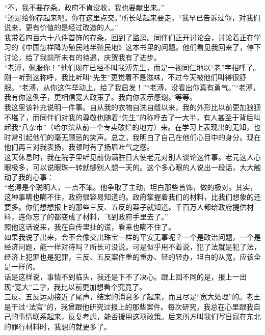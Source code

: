 “不，我不要存条。政府不肯没收，我也要献出来。”\\

“还是给你存起来吧。你在这里点交。”所长站起来要走，“我早已告诉过你，对我们说来，更有价值的是经过改造的人。”\\

我带着四百六十八件首饰的存条，回到了监房。同伴们正开讨论会，讨论着正在学习的《中国怎样降为殖民地半殖民地》这本书里的问题。他们看见我回来了，停下讨论，给了我前所未有的待遇，庆贺我有了进步。\\

“老溥，佩服你！”他们现在已经不叫我溥先生，而是一视同仁地以“老”字相呼了。刚一听到这称呼，我比听叫“先生”更觉着不是滋味，不过今天被他们叫得很舒服。“老溥，从你这件举动上，给了我启发！”“老溥，没看出你真有勇气。”“老溥，我有你这例子，更相信宽大政策了。我向你表示感谢。”等等。\\

我这里该补充说明一件事。自从我的衣物自洗自缝以来，我的外形比以前更加狼狈不堪了，而同伴们对我的尊敬也随着“先生”的称呼去了一大半，有人甚至于背后叫起我“八杂市”（哈尔滨从前一个专卖破烂的地方）来。在学习上表现出的无知，也时常引起他们的毫无顾忌的笑声。总之，我明白了自己在他们心目中的身分。现在他们再三对我表扬，我顿时有了扬眉吐气之感。\\

这天休息时，我在院子里听见前伪满驻日大使老元对别人谈论这件事。老元这人心眼极多，可以说眼珠一转就够别人想一天的。这个多心眼的人说出一段话，大大触动了我的心事：\\

“老溥是个聪明人，一点不笨。他争取了主动，坦白那些首饰，做的极对。其实，这种事瞒也瞒不住，政府很容易知道的。政府掌握着我们的材料，比我们想象的还要多。你们想想报上的那些三反、五反的案子就知道。千百万人都给政府提供材料，连你忘了的都变成了材料，飞到政府手里去了。”\\

照他这话说来，我在自传里扯的谎，看来也瞒不住了。\\

如果我说了出来，会不会像交出珠宝一样的平安无事呢？一个是政治问题，一个是经济问题，能一样对待吗？所长可没说。可是似乎用不着说，犯了法就是犯了法，经济上犯罪也是犯罪，三反、五反案件重的重办、轻的轻办，坦白的从宽，应该全是一样的。\\

话是这样说，事情不到临头，我还是下不了决心。跟上回不同的是，报上一出现“宽大”二字，我比以前更加想看个究竟了。\\

三反、五反运动接近了尾声，结案的消息多了起来，而且尽是“宽大处理”的。老王是干过“法官”的，我曾跟他研究过报上的那些案件。每次研究，我总在心里跟我自己的事情联系起来，反复考虑，能否援用这项政策。后来所方叫我们写日寇在东北的罪行材料时，我想的就更多了。\\

